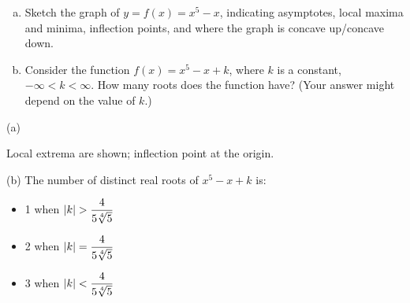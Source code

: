 \begin{question}[2011H]
\begin{enumerate}[(a)]
\item Sketch the graph of $y=f(x)=x^5-x$, indicating asymptotes,
local maxima and minima, inflection points, and where the
graph is concave up/concave down.

\item Consider the function $f(x)=x^5-x+k$, where $k$ is a constant,
$-\infty<k<\infty$. How many roots does the function have? (Your answer might
depend on the value of $k$.)
\end{enumerate}
\end{question}
\begin{hint}

\end{hint}
\begin{answer}
(a)
\begin{center}\end{center}
Local extrema are shown; inflection point at the origin.

(b) The number of distinct real roots of $x^5-x+k$ is:
\begin{itemize}
\item 1 when $|k|>\dfrac{4}{5\root{4}\of{5}}$
\item 2 when $|k|=\dfrac{4}{5\root{4}\of{5}}$
\item 3 when $|k|<\dfrac{4}{5\root{4}\of{5}}$
\end{itemize}
\end{answer}
